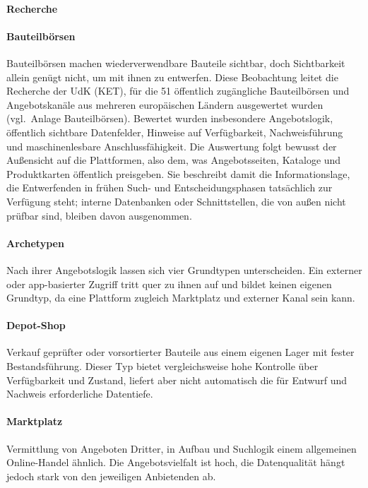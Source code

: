 \documentclass[type=zwischenbericht]{zukunftbau}
\begin{document}
\paragraph{Recherche}
\begin{SemioNest}
\paragraph{Bauteilbörsen}
Bauteilbörsen machen wiederverwendbare Bauteile sichtbar, doch Sichtbarkeit allein genügt nicht, um mit ihnen zu entwerfen. Diese Beobachtung leitet die Recherche der UdK (KET), für die 51 öffentlich zugängliche Bauteilbörsen und Angebotskanäle aus mehreren europäischen Ländern ausgewertet wurden (vgl.\ Anlage Bauteilbörsen). Bewertet wurden insbesondere Angebotslogik, öffentlich sichtbare Datenfelder, Hinweise auf Verfügbarkeit, Nachweisführung und maschinenlesbare Anschlussfähigkeit. Die Auswertung folgt bewusst der Außensicht auf die Plattformen, also dem, was Angebotsseiten, Kataloge und Produktkarten öffentlich preisgeben. Sie beschreibt damit die Informationslage, die Entwerfenden in frühen Such- und Entscheidungsphasen tatsächlich zur Verfügung steht; interne Datenbanken oder Schnittstellen, die von außen nicht prüfbar sind, bleiben davon ausgenommen.

\begin{SemioNest}
\paragraph{Archetypen}
Nach ihrer Angebotslogik lassen sich vier Grundtypen unterscheiden. Ein externer oder app-basierter Zugriff tritt quer zu ihnen auf und bildet keinen eigenen Grundtyp, da eine Plattform zugleich Marktplatz und externer Kanal sein kann.

\begin{SemioNest}
\paragraph{Depot-Shop}
Verkauf geprüfter oder vorsortierter Bauteile aus einem eigenen Lager mit fester Bestandsführung. Dieser Typ bietet vergleichsweise hohe Kontrolle über Verfügbarkeit und Zustand, liefert aber nicht automatisch die für Entwurf und Nachweis erforderliche Datentiefe.

\paragraph{Marktplatz}
Vermittlung von Angeboten Dritter, in Aufbau und Suchlogik einem allgemeinen Online-Handel ähnlich. Die Angebotsvielfalt ist hoch, die Datenqualität hängt jedoch stark von den jeweiligen Anbietenden ab.


\end{SemioNest}
\end{SemioNest}
\end{SemioNest}
\end{document}

